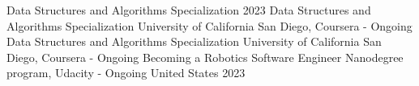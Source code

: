 
\begin{cvhonors}

  \cvhonor
    {Data Structures and Algorithms Specialization} %
    {2023} %
  \cvhonor
    {Data Structures and Algorithms Specialization} %
    {University of California San Diego, Coursera - Ongoing} %
  \cvhonor
    {Data Structures and Algorithms Specialization} %
    {University of California San Diego, Coursera - Ongoing} %
  \cvhonor
    {Becoming a Robotics Software Engineer} %
    {Nanodegree program, Udacity - Ongoing} %
    {United States} %
    {2023} %
\end{cvhonors}